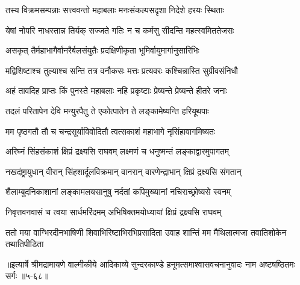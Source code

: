\twolineshloka
{तस्य विक्रमसम्पन्नाः सत्त्ववन्तो महाबलाः}
{मनःसंकल्पसदृशा निदेशे हरयः स्थिताः} %

\twolineshloka
{येषां नोपरि नाधस्तान्न तिर्यक् सज्जते गतिः}
{न च कर्मसु सीदन्ति महत्स्वमिततेजसः} %

\twolineshloka
{असकृत् तैर्महाभागैर्वानरैर्बलसंयुतैः}
{प्रदक्षिणीकृता भूमिर्वायुमार्गानुसारिभिः} %

\twolineshloka
{मद्विशिष्टाश्च तुल्याश्च सन्ति तत्र वनौकसः}
{मत्तः प्रत्यवरः कश्चिन्नास्ति सुग्रीवसंनिधौ} %

\twolineshloka
{अहं तावदिह प्राप्तः किं पुनस्ते महाबलाः}
{नहि प्रकृष्टाः प्रेष्यन्ते प्रेष्यन्ते हीतरे जनाः} %

\twolineshloka
{तदलं परितापेन देवि मन्युरपैतु ते}
{एकोत्पातेन ते लङ्कामेष्यन्ति हरियूथपाः} %

\twolineshloka
{मम पृष्ठगतौ तौ च चन्द्रसूर्याविवोदितौ}
{त्वत्सकाशं महाभागे नृसिंहावागमिष्यतः} %

\twolineshloka
{अरिघ्नं सिंहसंकाशं क्षिप्रं द्रक्ष्यसि राघवम्}
{लक्ष्मणं च धनुष्मन्तं लङ्काद्वारमुपागतम्} %

\twolineshloka
{नखदंष्ट्रायुधान् वीरान् सिंहशार्दूलविक्रमान्}
{वानरान् वारणेन्द्राभान् क्षिप्रं द्रक्ष्यसि संगतान्} %

\twolineshloka
{शैलाम्बुदनिकाशानां लङ्कामलयसानुषु}
{नर्दतां कपिमुख्यानां नचिराच्छ्रोष्यसे स्वनम्} %

\twolineshloka
{निवृत्तवनवासं च त्वया सार्धमरिंदमम्}
{अभिषिक्तमयोध्यायां क्षिप्रं द्रक्ष्यसि राघवम्} %

\twolineshloka
{ततो मया वाग्भिरदीनभाषिणी शिवाभिरिष्टाभिरभिप्रसादिता}
{उवाह शान्तिं मम मैथिलात्मजा तवातिशोकेन तथातिपीडिता} %


॥इत्यार्षे श्रीमद्रामायणे वाल्मीकीये आदिकाव्ये सुन्दरकाण्डे हनूमत्समाश्वासवचनानुवादः नाम अष्टषष्ठितमः सर्गः ॥५-६८॥

